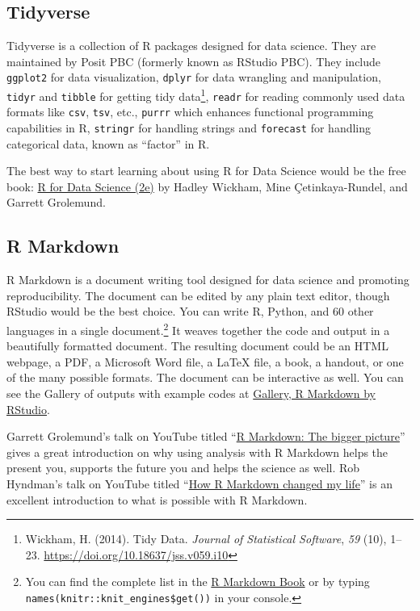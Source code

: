 \documentclass[
  letterpaper,
  DIV=11,
  numbers=noendperiod]{scrartcl}
\begin{document}
\hypertarget{tidyverse}{%
\subsection{Tidyverse}\label{tidyverse}}

Tidyverse is a collection of R packages designed for data science. They
are maintained by Posit PBC (formerly known as RStudio PBC). They
include \texttt{ggplot2} for data visualization, \texttt{dplyr} for data
wrangling and manipulation, \texttt{tidyr} and \texttt{tibble} for
getting tidy data\footnote{Wickham, H. (2014). Tidy Data. \emph{Journal
  of Statistical Software}, \emph{59} (10), 1--23.
  \url{https://doi.org/10.18637/jss.v059.i10}}, \texttt{readr} for
reading commonly used data formats like \texttt{csv}, \texttt{tsv},
etc., \texttt{purrr} which enhances functional programming capabilities
in R, \texttt{stringr} for handling strings and \texttt{forecast} for
handling categorical data, known as ``factor'' in R.

The best way to start learning about using R for Data Science would be
the free book: \href{https://r4ds.hadley.nz/}{R for Data Science (2e)}
by Hadley Wickham, Mine Çetinkaya-Rundel, and Garrett Grolemund.

\hypertarget{r-markdown}{%
\subsection{R Markdown}\label{r-markdown}}

R Markdown is a document writing tool designed for data science and
promoting reproducibility. The document can be edited by any plain text
editor, though RStudio would be the best choice. You can write R,
Python, and 60 other languages in a single document.\footnote{You can
  find the complete list in the
  \href{https://bookdown.org/yihui/rmarkdown/language-engines.html}{R
  Markdown Book} or by typing
  \texttt{names(knitr::knit\_engines\$get())} in your console.} It
weaves together the code and output in a beautifully formatted document.
The resulting document could be an HTML webpage, a PDF, a Microsoft Word
file, a LaTeX file, a book, a handout, or one of the many possible
formats. The document can be interactive as well. You can see the
Gallery of outputs with example codes at
\href{https://rmarkdown.rstudio.com/gallery.html}{Gallery, R Markdown by
RStudio}.

Garrett Grolemund's talk on YouTube titled
``\href{https://www.youtube.com/watch?v=s9aWmU0atlQ}{R Markdown: The
bigger picture}'' gives a great introduction on why using analysis with
R Markdown helps the present you, supports the future you and helps the
science as well. Rob Hyndman's talk on YouTube titled
``\href{https://www.youtube.com/watch?v=_D-ux3MqGug}{How R Markdown
changed my life}'' is an excellent introduction to what is possible with
R Markdown.
\end{document}

